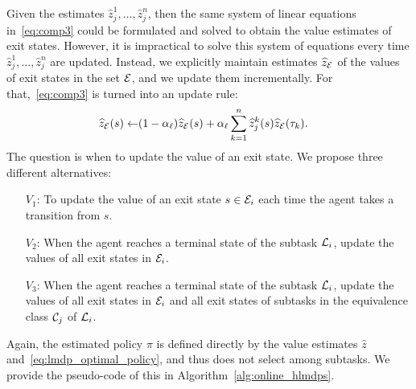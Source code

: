 Given the estimates $\widehat{z}_j^1,\ldots,\widehat{z}_j^n$, then the same system of linear equations in~\eqref{eq:comp3} could be formulated and solved to obtain the value estimates of exit states. However, it is impractical to solve this system of equations every time %
$\widehat{z}_j^1,\ldots,\widehat{z}_j^n$ are updated. Instead, we explicitly maintain estimates $\widehat{z}_{\mathcal{E}}$ of the values of exit states in the set $\mathcal{E}$, and we update them incrementally. 
For that,~\eqref{eq:comp3} is turned into an update rule:
\begin{align}\label{eq:comprule}
\widehat{z}_{\mathcal{E}}(s) \leftarrow &(1 - \alpha_\ell) \widehat{z}_{\mathcal{E}}(s) + \alpha_\ell \sum_{k=1}^n \widehat{z}_j^k(s) \widehat{z}_{\mathcal{E}}(\tau_k).
\end{align}
The question is when to update the value of an exit state. We propose three different alternatives:
\begin{itemize}
\item[$V_1$:] To update the value of an exit state $s\in\mathcal{E}_i$ each time the agent takes a transition from $s$.
\item[$V_2$:] When the agent reaches a terminal state of the subtask $\mathcal{L}_i$, update the values of all exit states in $\mathcal{E}_i$.
\item[$V_3$:] When the agent reaches a terminal state of the subtask $\mathcal{L}_i$, update the values of all exit states in $\mathcal{E}_i$ and all exit states of subtasks in the equivalence class $\mathcal{C}_j$ of $\mathcal{L}_i$.
\end{itemize}
Again, the estimated policy $\pi$ is defined directly by the value estimates $\widehat{z}$ and~\eqref{eq:lmdp_optimal_policy}, and thus does not select among subtasks. We provide the pseudo-code of this in Algorithm~\ref{alg:online_hlmdps}.

